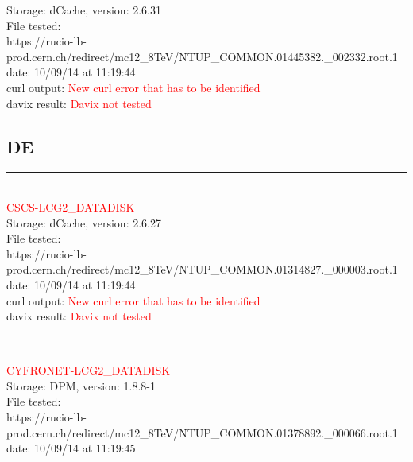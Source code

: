 Storage: dCache, version: 2.6.31\\

File tested:\\
\footnotesize{https://rucio-lb-prod.cern.ch/redirect/mc12\_8TeV/NTUP\_COMMON.01445382.\_002332.root.1}\\

date: 10/09/14 at 11:19:44\\

curl output:  \textcolor{red}{New curl error that has to be identified}\\

davix result:  \textcolor{red}{Davix not tested}\\

\subsection{DE}

\rule{\textwidth}{1pt}\\

\textcolor{red}{\normalsize{CSCS-LCG2\_DATADISK}}\\

Storage: dCache, version: 2.6.27\\

File tested:\\
\footnotesize{https://rucio-lb-prod.cern.ch/redirect/mc12\_8TeV/NTUP\_COMMON.01314827.\_000003.root.1}\\

date: 10/09/14 at 11:19:44\\

curl output:  \textcolor{red}{New curl error that has to be identified}\\

davix result:  \textcolor{red}{Davix not tested}\\

\rule{\textwidth}{1pt}\\

\textcolor{red}{\normalsize{CYFRONET-LCG2\_DATADISK}}\\

Storage: DPM, version: 1.8.8-1\\

File tested:\\
\footnotesize{https://rucio-lb-prod.cern.ch/redirect/mc12\_8TeV/NTUP\_COMMON.01378892.\_000066.root.1}\\

date: 10/09/14 at 11:19:45\\

